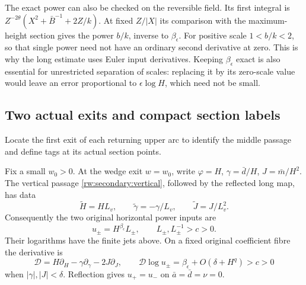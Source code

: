 The exact power can also be checked on the reversible field. Its
first integral is
$Z^{-2\theta}(X^2+\bar B^{-1}+2Z/k)$.
At fixed $Z/|X|$ its comparison with the maximum-height section gives
the power $b/k$, inverse to $\beta_\epsilon$.
For positive scale $1<b/k<2$, so that single power need not have
an ordinary second derivative at zero. This is why the long estimate
uses Euler input derivatives. Keeping $\beta_\epsilon$ exact is also
essential for unrestricted separation of scales: replacing it by its
zero-scale value would leave an error proportional to
$\epsilon\log H$, which need not be small.

\subsection{Two actual exits and compact section labels}

Locate the first exit of each returning upper arc to identify the middle
passage and define tags at its actual section points.

Fix a small $w_0>0$. At the wedge exit $w=w_0$, write
$\varphi=H$, $\gamma=\bar d/H$, $J=\bar m/H^2$.
The vertical passage \eqref{rw:secondary:vertical}, followed by
the reflected long map, has data
\[
 \widetilde H=HL_v,\qquad
 \widetilde\gamma=-\gamma/L_v,\qquad
 \widetilde J=J/L_v^2.
\]
Consequently the two original horizontal power inputs are
\begin{equation}\label{rw:secondary:wedge-inputs}
 u_\pm=H^{\beta_\epsilon}L_\pm,\qquad
 L_\pm,L_\pm^{-1}>c>0.
\end{equation}
Their logarithms have the finite jets above.
On a fixed original coefficient fibre the derivative is
\[
 \mathcal D=H\partial_H-\gamma\partial_\gamma-2J\partial_J,\qquad
 \mathcal D\log u_\pm
      =\beta_\epsilon+O(\delta+H^q)>c>0
\]
when $|\gamma|,|J|<\delta$.
Reflection gives $u_+=u_-$ on $\bar a=\bar d=\nu=0$.

